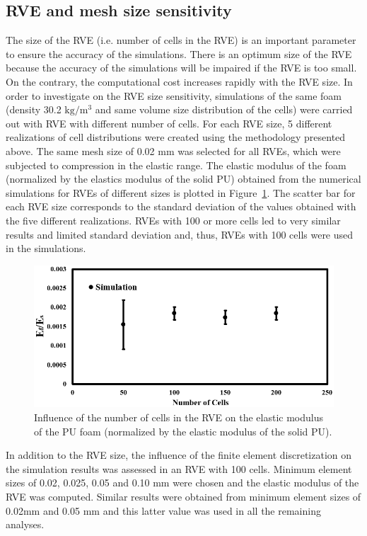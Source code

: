 \documentclass[review]{elsarticle}
\begin{document}
\subsection{RVE and mesh size sensitivity}
The size of the RVE (i.e. number of cells in the RVE) is an important parameter to ensure the accuracy of the simulations. There is an optimum size of the RVE because the accuracy of the simulations will be impaired if the RVE is too small. On the contrary, the computational cost increases rapidly with the RVE size. In order to investigate on the RVE size sensitivity, simulations of the same foam (density 30.2 $\mathrm{kg/m^3}$ and same volume size distribution of the cells) were carried out with RVE with different number of cells. For each RVE size, 5 different realizations of cell distributions were created using the methodology presented above. The same mesh size of 0.02 mm was selected for all RVEs, which were subjected to compression in the elastic range. The elastic modulus of the foam (normalized by the elastics modulus of the solid PU) obtained from the numerical simulations for RVEs of different sizes is plotted in Figure~\ref{fig:RVEsizeSensitivity}. The scatter bar for each RVE size corresponds to the standard deviation of the values obtained with the five different realizations. RVEs with 100 or more cells led to very similar results and limited standard deviation and, thus, RVEs with 100 cells were used in the simulations.
\begin{figure}[hb]
  \centering
  \includegraphics[scale=0.6]{RVEsizeSensitivity}
  \captionsetup{justification=centering}
  \caption[Close up of \textit{Hemidactylus} sp. ]
   {Influence of the number of cells in the RVE on the elastic modulus of the PU foam 
   (normalized by the elastic modulus of the solid PU).}
  \label{fig:RVEsizeSensitivity}
\end{figure}

In addition to the RVE size, the influence of the finite element discretization on the simulation results was assessed in an RVE with 100 cells. Minimum element sizes of 0.02, 0.025, 0.05 and 0.10 mm were chosen and the elastic modulus of the RVE was computed. Similar results were obtained from minimum element sizes of 0.02mm and 0.05 mm and this latter value was used in all the remaining analyses. 
\end{document}
